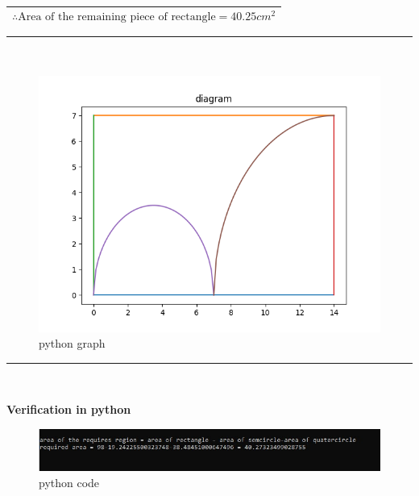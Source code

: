 \documentclass[11pt,a4paper]{article}
\begin{document}
\begin{center}
\renewcommand{\arraystretch}{1.2}
\begin{tabular}{|c|}
\hline
    $$ \therefore \text{Area of the remaining piece of rectangle} = 40.25cm^2 $$ &  \\
\hline
\end{tabular}
\end{center}


 \rule{\textwidth}{0.4pt}\\
\begin{figure}[h!]
    \centering
    \includegraphics[scale = 0.6]{Figure_2.png}
    \caption{python graph}
    \label{fig:my_pythondiagram}
\end{figure}

\rule{\textwidth}{0.4pt}\\
\begin{center}
\textbf{Verification in python}    
\end{center}

\begin{figure}[h!]
    \centering
    \includegraphics[scale = 0.6]{Figure_3.jpg}
    \caption{python code}
    \label{fig:my_codeverification}
\end{figure}
\end{document}
